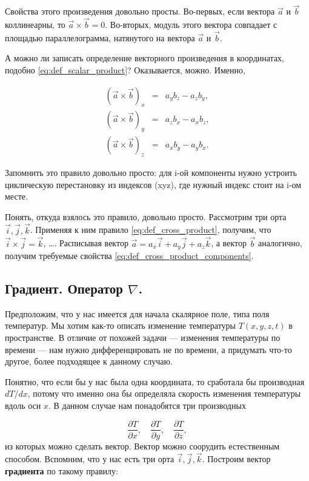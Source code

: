 \documentclass[11pt,a4paper]{article}
\numberwithin{equation}{section}
\newcommand{\nn}{\nonumber}
\newcommand{\pt}{\partial}
\begin{document}
Свойства этого произведения довольно просты. Во-первых, если вектора
$\vec{a}$ и $\vec{b}$ коллинеарны, то $\vec{a} \times
\vec{b}=0$. Во-вторых, модуль этого вектора совпадает с площадью
параллелограмма, натянутого на вектора $\vec{a}$ и $\vec{b}$.

А можно ли записать определение векторного произведения в координатах,
подобно \eqref{eq:def_scalar_product}? Оказывается, можно. Именно, 

\begin{eqnarray}
  \label{eq:def_cross_product_components}
  \nn
  (\vec{a} \times \vec{b})_x &=& a_y b_z -a_z b_y,\\
  (\vec{a} \times \vec{b})_y &=& a_z b_x -a_x b_z,\\
  \nn
  (\vec{a} \times \vec{b})_z &=& a_x b_y -a_y b_x.
\end{eqnarray}

Запомнить это правило довольно просто: для i-ой компоненты нужно
устроить циклическую перестановку из индексов (xyz), где нужный индекс
стоит на i-ом месте. 

Понять, откуда взялось это правило, довольно просто. Рассмотрим три
орта $\vec{i},\vec{j},\vec{k}$. Применяя к ним правило
\eqref{eq:def_cross_product}, получим, что $\vec{i} \times \vec{j} =
\vec{k}$, \ldots. Расписывая вектор $\vec{a} = a_x \vec{i} + a_y
\vec{j} + a_z \vec{k}$, а вектор $\vec{b}$ аналогично, получим
требуемые свойства \eqref{eq:def_cross_product_components}. 

\subsection{Градиент. Оператор $\nabla$.}
\label{sec:gradient}

Предположим, что у нас имеется для начала скалярное поле, типа поля
температур. Мы хотим как-то описать изменение температуры $T(x,y,z,t)$
в пространстве. В отличие от похожей задачи --- изменения температуры
по времени --- нам нужно дифференцировать не по времени, а придумать
что-то другое, более подходящее к данному случаю.

Понятно, что если бы у нас была одна координата, то сработала бы
производная $dT/dx$, потому что именно она бы определяла скорость
изменения температуры вдоль оси $x$. В данном случае нам понадобятся
три производных 

\begin{equation}
  \label{eq:def_grad_1}
  \frac{\pt T}{\pt x}, \quad   \frac{\pt T}{\pt y}, \quad   \frac{\pt
    T}{\pt z},
\end{equation}
из которых можно сделать вектор. Вектор можно соорудить естественным
способом. Вспомним, что у нас есть три орта
$\vec{i},\vec{j},\vec{k}$. Построим вектор \textbf{градиента} по такому
правилу:
\end{document}
